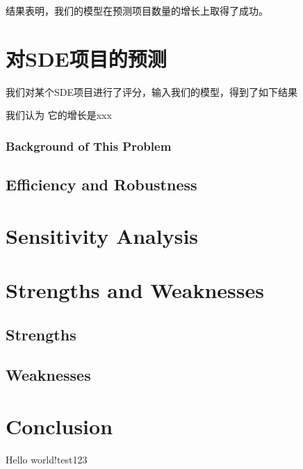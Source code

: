 \documentclass[a4paper]{article}
\begin{document}
结果表明，我们的模型在预测项目数量的增长上取得了成功。



\section{对SDE项目的预测}
我们对某个SDE项目进行了评分，输入我们的模型，得到了如下结果

我们认为 它的增长是xxx
\subsubsection{Background of This Problem}
\subsection{Efficiency and Robustness}
\section{Sensitivity Analysis}
\section{Strengths and Weaknesses}
\subsection{Strengths}
\subsection{Weaknesses}
\section{Conclusion}
Hello world!test123
\end{document}
